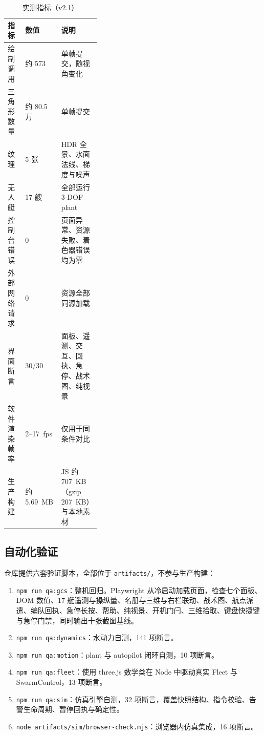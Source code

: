\documentclass[UTF8, a4paper, 11pt]{ctexart}
\newcommand{\file}[1]{\texttt{#1}}
\begin{document}
\begin{table}[H]
\centering
\caption{实测指标（v2.1）}
\label{tab:perf}
\small
\begin{tabular}{@{}l l p{0.36\linewidth}@{}}
\toprule
\textbf{指标} & \textbf{数值} & \textbf{说明} \\
\midrule
绘制调用 & 约 573 & 单帧提交，随视角变化 \\
三角形数量 & 约 80.5 万 & 单帧提交 \\
纹理 & 5 张 & HDR 全景、水面法线、梯度与噪声 \\
无人艇 & 17 艘 & 全部运行 3-DOF plant \\
控制台错误 & 0 & 页面异常、资源失败、着色器错误均为零 \\
外部网络请求 & 0 & 资源全部同源加载 \\
界面断言 & 30/30 & 面板、遥测、交互、回执、急停、战术图、纯视景 \\
软件渲染帧率 & 2--17~fps & 仅用于同条件对比 \\
生产构建 & 约 5.69~MB & JS 约 707~KB（gzip 207~KB）与本地素材 \\
\bottomrule
\end{tabular}
\end{table}

\subsection{自动化验证}

仓库提供六套验证脚本，全部位于 \file{artifacts/}，不参与生产构建：

\begin{enumerate}
  \item \file{npm run qa:gcs}：整机回归。Playwright 从冷启动加载页面，检查七个面板、DOM 数值、17 艇遥测与操纵量、名册与三维与右栏联动、战术图、航点派遣、编队回执、急停长按、帮助、纯视景、开机门闩、三维拾取、键盘快捷键与急停门禁，同时输出十张截图基线。
  \item \file{npm run qa:dynamics}：水动力自测，141 项断言。
  \item \file{npm run qa:motion}：plant 与 autopilot 闭环自测，10 项断言。
  \item \file{npm run qa:fleet}：使用 three.js 数学类在 Node 中驱动真实 Fleet 与 SwarmControl，13 项断言。
  \item \file{npm run qa:sim}：仿真引擎自测，32 项断言，覆盖快照结构、指令校验、告警生命周期、暂停回执与确定性。
  \item \file{node artifacts/sim/browser-check.mjs}：浏览器内仿真集成，16 项断言。
\end{enumerate}
\end{document}
